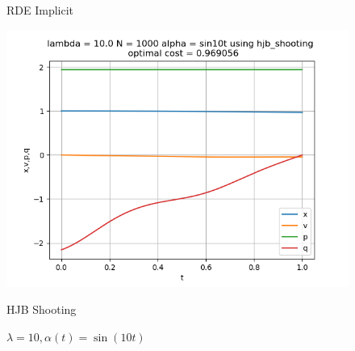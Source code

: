 \begin{figure}[H]
\begin{minipage}{0.3\textwidth}
		\caption{RDE Implicit}
	\end{minipage}
	\hfill
	\begin{minipage}{0.3\textwidth}
		\centering
		\includegraphics[width=\linewidth]{hjb_shooting_l10_alphasin.png}
		\caption{HJB Shooting}
	\end{minipage}
	\caption{$\lambda = 10, \alpha(t) = \sin(10 t)$}
\end{figure}

